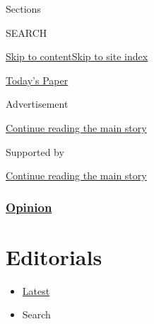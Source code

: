 Sections

SEARCH

\protect\hyperlink{site-content}{Skip to
content}\protect\hyperlink{site-index}{Skip to site index}

\href{https://myaccount.nytimes.com/auth/login?response_type=cookie\&client_id=vi}{}

\href{https://www.nytimes.com/section/todayspaper}{Today's Paper}

Advertisement

\protect\hyperlink{after-top}{Continue reading the main story}

Supported by

\protect\hyperlink{after-sponsor}{Continue reading the main story}

\hypertarget{opinion}{%
\subsubsection{\texorpdfstring{\href{/section/opinion}{Opinion}}{Opinion}}\label{opinion}}

\hypertarget{editorials}{%
\section{Editorials}\label{editorials}}

\begin{itemize}
\tightlist
\item
  \protect\hyperlink{stream-panel}{Latest}
\item
  Search
\end{itemize}

